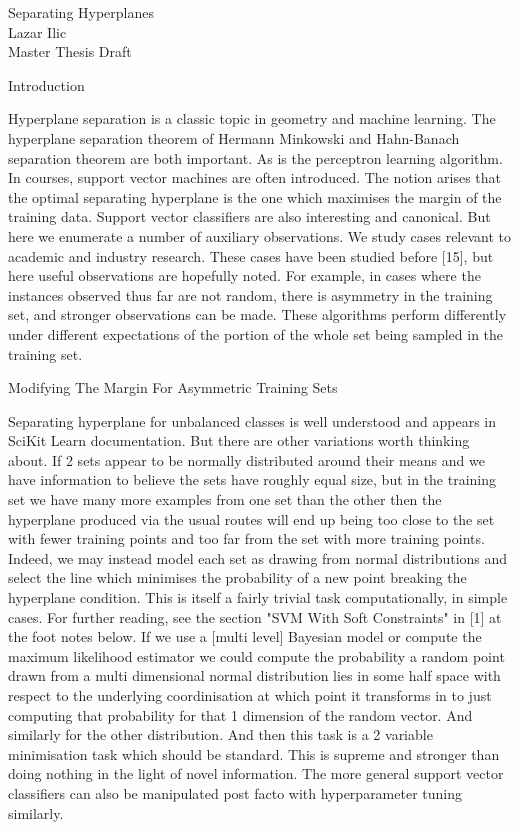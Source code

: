 Separating Hyperplanes \\
Lazar Ilic \\
Master Thesis Draft

	Introduction

Hyperplane separation is a classic topic in geometry and machine learning. The hyperplane separation theorem of Hermann Minkowski and Hahn-Banach separation theorem are both important. As is the perceptron learning algorithm. In courses, support vector machines are often introduced. The notion arises that the optimal separating hyperplane is the one which maximises the margin of the training data. Support vector classifiers are also interesting and canonical. But here we enumerate a number of auxiliary observations. We study cases relevant to academic and industry research. These cases have been studied before [15], but here useful observations are hopefully noted. For example, in cases where the instances observed thus far are not random, there is asymmetry in the training set, and stronger observations can be made. These algorithms perform differently under different expectations of the portion of the whole set being sampled in the training set.

	Modifying The Margin For Asymmetric Training Sets

Separating hyperplane for unbalanced classes is well understood and appears in SciKit Learn documentation. But there are other variations worth thinking about. If 2 sets appear to be normally distributed around their means and we have information to believe the sets have roughly equal size, but in the training set we have many more examples from one set than the other then the hyperplane produced via the usual routes will end up being too close to the set with fewer training points and too far from the set with more training points. Indeed, we may instead model each set as drawing from normal distributions and select the line which minimises the probability of a new point breaking the hyperplane condition. This is itself a fairly trivial task computationally, in simple cases. For further reading, see the section "SVM With Soft Constraints" in [1] at the foot notes below. If we use a [multi level] Bayesian model or compute the maximum likelihood estimator we could compute the probability a random point drawn from a multi dimensional normal distribution lies in some half space with respect to the underlying coordinisation at which point it transforms in to just computing that probability for that 1 dimension of the random vector. And similarly for the other distribution. And then this task is a 2 variable minimisation task which should be standard. This is supreme and stronger than doing nothing in the light of novel information. The more general support vector classifiers can also be manipulated post facto with hyperparameter tuning similarly.


